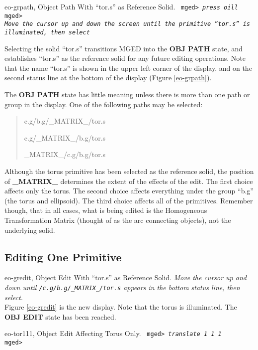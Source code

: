 \mfig eo-grpath, Object Path With ``tor.s'' as Reference Solid.
\noindent
{\tt
mged> {\em press oill}\\
mged>\\
{\em Move the cursor up and down the screen until the primitive ``tor.s''
is illuminated, then select}\\
}

Selecting the solid ``tor.s'' transitions MGED into the {\bf OBJ PATH}
state, and establishes ``tor.s'' as the reference solid for any future
editing operations.
Note that the name ``tor.s'' is shown in the upper left corner of the
display, and on the second status line at the bottom of the display
(Figure \ref{eo-grpath}).

The {\bf OBJ PATH} state has little meaning unless there is more than one path
or group in the display.  One of the following paths may be selected:

\begin{quote}
c.g/b.g/\_MATRIX\_/tor.s

c.g/\_MATRIX\_/b.g/tor.s

\_MATRIX\_/c.g/b.g/tor.s
\end{quote}

Although the torus primitive has been selected as the reference solid,
the position of {\bf \_MATRIX\_} determines the extent of the effects of
the edit.  The first choice affects only the torus.  The second choice
affects everything under the group ``b.g'' (the torus and ellipsoid).
The third choice affects all of the primitives.  Remember though, that
in all cases, what is being edited is the Homogeneous Transformation
Matrix (thought of as the arc connecting objects), not the underlying
solid.

\subsection{Editing One Primitive}

\mfig eo-gredit, Object Edit With ``tor.s'' as Reference Solid.
\noindent
{\em Move the cursor up and down until {\tt /c.g/b.g/\_MATRIX\_/tor.s} appears
in the bottom status line, then select.}\\

Figure \ref{eo-gredit} is the new display.  Note that the torus is
illuminated. The {\bf OBJ EDIT} state has been reached.

\mfig eo-tor111, Object Edit Affecting Torus Only.
\noindent
{\tt
mged> {\em translate 1 1 1}\\
mged>\\
}

